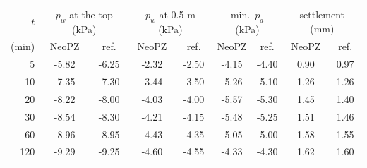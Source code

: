 \begin{tabular}{rcccccccc}
\toprule
$t$ & \multicolumn{2}{c}{$p_w$ at the top (kPa)} & \multicolumn{2}{c}{$p_w$ at 0.5 m (kPa)} & \multicolumn{2}{c}{min.\ $p_a$ (kPa)} & \multicolumn{2}{c}{settlement (mm)}\\
(min) & NeoPZ & ref. & NeoPZ & ref. & NeoPZ & ref. & NeoPZ & ref.\\
\midrule
5 & -5.82 & -6.25 & -2.32 & -2.50 & -4.15 & -4.40 & 0.90 & 0.97\\
10 & -7.35 & -7.30 & -3.44 & -3.50 & -5.26 & -5.10 & 1.26 & 1.26\\
20 & -8.22 & -8.00 & -4.03 & -4.00 & -5.57 & -5.30 & 1.45 & 1.40\\
30 & -8.54 & -8.30 & -4.21 & -4.15 & -5.48 & -5.25 & 1.51 & 1.46\\
60 & -8.96 & -8.95 & -4.43 & -4.35 & -5.05 & -5.00 & 1.58 & 1.55\\
120 & -9.29 & -9.25 & -4.60 & -4.55 & -4.33 & -4.30 & 1.62 & 1.60\\
\bottomrule
\end{tabular}

